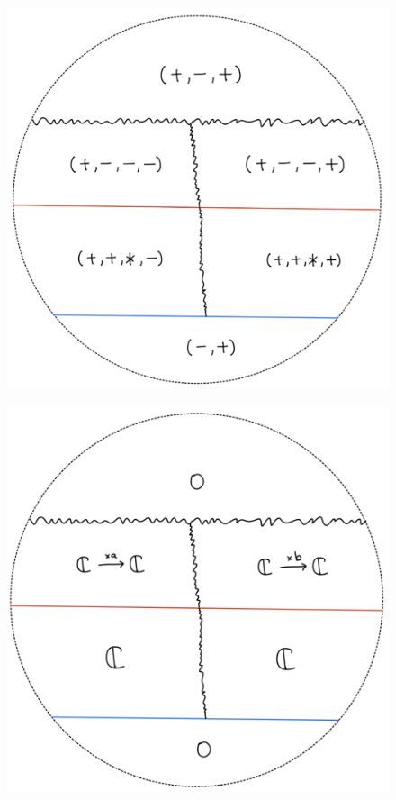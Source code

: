 \begin{figure}[H]
    \centering
    \includegraphics[scale = 0.95]{diagrams/lemma2/38.png} 
    \caption{}
    \label{fig:your-label}
\end{figure}
\begin{figure}[H]
    \centering
    \includegraphics[scale = 0.95]{diagrams/lemma2/39.png} 
    \caption{}
    \label{fig:your-label}
\end{figure}
